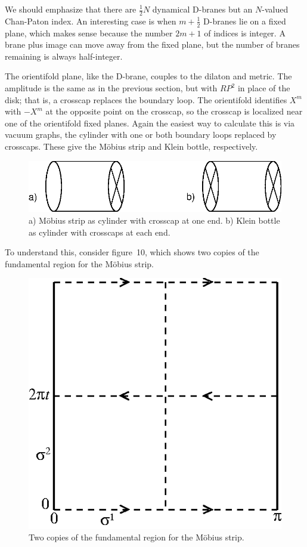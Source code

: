 \documentclass[12pt]{article}
\begin{document}
We should emphasize that there are $\frac{1}{2}N$
dynamical D-branes but an $N$-valued Chan-Paton index.  An interesting
case is when $m + \frac{1}{2}$ D-branes lie on a fixed plane, which makes
sense because the number $2m + 1$ of indices is integer.  A brane plus
image can move away from the fixed plane, but the number of branes remaining
is always half-integer.

The orientifold plane, like the D-brane, couples to the dilaton and
metric. The amplitude is the same as in the previous section, but with
$RP^2$ in place of the disk; that is, a crosscap replaces the boundary
loop.  The orientifold identifies $X^m$ with $-X^m$ at the opposite
point on the crosscap, so the crosscap is localized near one of the
orientifold fixed planes.  Again the easiest way to calculate this is
via vacuum graphs, the cylinder with one or both boundary loops replaced
by crosscaps.  These give the M\"obius strip and Klein bottle,
respectively.
\begin{figure}
\begin{center}
\leavevmode
\includegraphics{opentwists.eps}
\end{center}
\caption[]{a) M\"obius strip as cylinder with
crosscap at one end.  b) Klein bottle as cylinder with crosscaps at
each end.}
\end{figure}
To understand this, consider figure~10, which shows two copies of
the fundamental region for the M\"obius strip.
\begin{figure}
\begin{center}
\leavevmode
\includegraphics{mob.eps}
\end{center}
\caption[]{Two copies of the fundamental region for the M\"obius strip.
}
\end{figure}
\end{document}
